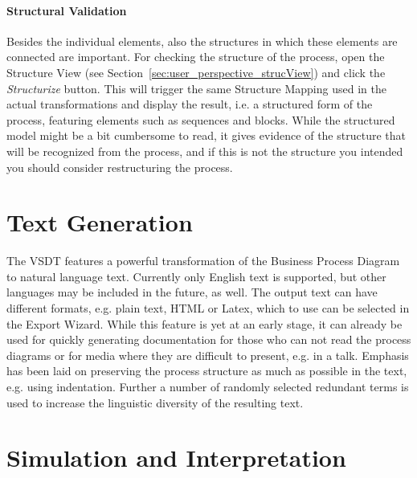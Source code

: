 \paragraph{Structural Validation}
Besides the individual elements, also the structures in which these elements are connected are important.  For checking the structure of the process, open the Structure View (see Section~\ref{sec:user_perspective_strucView}) and click the \emph{Structurize} button.  This will trigger the same Structure Mapping used in the actual transformations and display the result, i.e. a structured form of the process, featuring elements such as sequences and blocks.  While the structured model might be a bit cumbersome to read, it gives evidence of the structure that will be recognized from the process, and if this is not the structure you intended you should consider restructuring the process.



\section{Text Generation}
\label{sec:user_features_text}
 
The VSDT features a powerful transformation of the Business Process Diagram to natural language text.  Currently only English text is supported, but other languages may be included in the future, as well.  The output text can have different formats, e.g. plain text, HTML or Latex, which to use can be selected in the Export Wizard.  While this feature is yet at an early stage, it can already be used for quickly generating documentation for those who can not read the process diagrams or for media where they are difficult to present, e.g. in a talk.  Emphasis has been laid on preserving the process structure as much as possible in the text, e.g. using indentation.  Further a number of randomly selected redundant terms is used to increase the linguistic diversity of the resulting text.


\section{Simulation and Interpretation}
\label{sec:user_features_sim}

